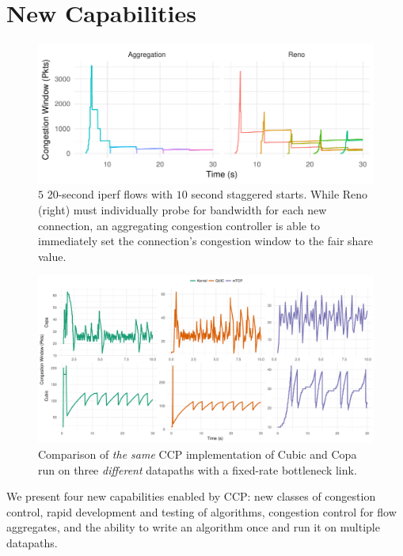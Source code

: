 \section{New Capabilities}
\label{s:capabilities}

\begin{figure}
    \centering
    \includegraphics[width=\columnwidth]{img/stair}
    \caption{$5$ 20-second iperf flows with $10$ second staggered starts. While Reno (right) must individually probe for bandwidth for each new connection, an aggregating congestion controller is able to immediately set the connection's congestion window to the fair share value.}
    \label{fig:cap:agg}
\end{figure}
\begin{figure}[t!]
    \centering
    \includegraphics[width=2\columnwidth]{img/new-wora}
    \caption{Comparison of \textit{the same} CCP implementation of Cubic and Copa run on three \textit{different} datapaths with a fixed-rate bottleneck link. %
    }\label{fig:datapaths:wora}
\end{figure}

We present four new capabilities enabled by CCP: new classes of congestion control, rapid development and testing of algorithms, congestion control for flow aggregates, and the ability to write an algorithm once and run it on multiple datapaths.

